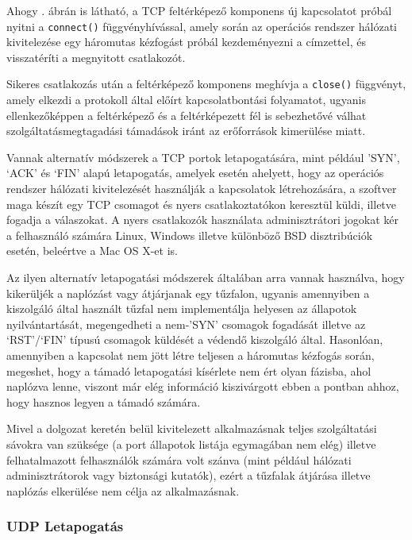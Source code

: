 	Ahogy \az{\ref{tcp3way_hu}}. ábrán is látható, a TCP feltérképező komponens új kapcsolatot próbál nyitni a \texttt{connect()} függvényhívással, amely során az operációs rendszer hálózati kivitelezése egy háromutas kézfogást próbál kezdeményezni a címzettel, és visszatéríti a megnyitott csatlakozót.
	
	Sikeres csatlakozás után a feltérképező komponens meghívja a \texttt{close()} függvényt, amely elkezdi a protokoll által előírt kapcsolatbontási folyamatot, ugyanis ellenkezőképpen a feltérképező és a feltérképezett fél is sebezhetővé válhat szolgáltatásmegtagadási támadások iránt az erőforrások kimerülése miatt\cite{erickson08}.
	
	Vannak alternatív módszerek a TCP portok letapogatására, mint például 'SYN', `ACK' és `FIN' alapú letapogatás\cite{kris07}, amelyek esetén ahelyett, hogy az operációs rendszer hálózati kivitelezését használják a kapcsolatok létrehozására, a szoftver maga készít egy TCP csomagot és nyers csatlakoztatókon keresztül küldi, illetve fogadja a válaszokat. A nyers csatlakozók használata adminisztrátori jogokat kér a felhasználó számára Linux, Windows illetve különböző BSD disztribúciók esetén, beleértve a Mac OS X-et is.
	
	Az ilyen alternatív letapogatási módszerek általában arra vannak használva, hogy kikerüljék a naplózást vagy átjárjanak egy tűzfalon, ugyanis amennyiben a kiszolgáló által használt tűzfal nem implementálja helyesen az állapotok nyilvántartását, megengedheti a nem-'SYN' csomagok fogadását illetve az `RST'/`FIN' típusú csomagok küldését a védendő kiszolgáló által. Hasonlóan, amennyiben a kapcsolat nem jött létre teljesen a háromutas kézfogás során, megeshet, hogy a támadó letapogatási kísérlete nem ért olyan fázisba, ahol naplózva lenne, viszont már elég információ kiszivárgott ebben a pontban ahhoz, hogy hasznos legyen a támadó számára.
	
	Mivel a dolgozat keretén belül kivitelezett alkalmazásnak teljes szolgáltatási sávokra van szüksége (a port állapotok listája egymagában nem elég) illetve felhatalmazott felhasználók számára volt szánva (mint például hálózati adminisztrátorok vagy biztonsági kutatók), ezért a tűzfalak átjárása illetve naplózás elkerülése nem célja az alkalmazásnak.

\subsubsection*{UDP Letapogatás}

